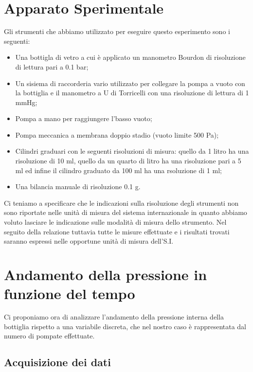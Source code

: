 \section{Apparato Sperimentale}

Gli strumenti che abbiamo utilizzato per eseguire questo esperimento sono i seguenti:
\begin{itemize}
	\item{Una bottigla di vetro a cui è applicato un manometro Bourdon di risoluzione di lettura pari a 0.1 bar;}
	\item{Un sisiema di raccorderia vario utilizzato per collegare la pompa a vuoto con la bottiglia e il manometro a U di Torricelli con una risoluzione di lettura di 1 mmHg;}
	\item{Pompa a mano per raggiungere l'basso vuoto;}
	\item{Pompa meccanica a membrana doppio stadio (vuoto limite 500 Pa);}
	\item{Cilindri graduari con le seguenti risoluzioni di misura: quello da 1 litro ha una risoluzione di 10 ml, quello da un quarto di litro ha una risoluzione pari a 5 ml ed infine il cilindro graduato da 100 ml ha una rsoluzione di 1 ml;}
	\item{Una bilancia manuale di risoluzione 0.1 g.}
\end{itemize}

Ci teniamo a specificare che le indicazioni sulla risoluzione degli strumenti non sono riportate nelle unità di misura del sistema internazionale in quanto abbiamo voluto lasciare le indicazione sulle modalità di misura dello strumento. Nel seguito della relazione tuttavia tutte le misure effettuate e i risultati trovati saranno espressi nelle opportune unità di misura dell'S.I.

\section{Andamento della pressione in funzione del tempo}

Ci proponiamo ora di analizzare l'andamento della pressione interna della bottiglia rispetto a una variabile discreta, che nel nostro caso è rappresentata dal numero di pompate effettuate.

\subsection{Acquisizione dei dati}


